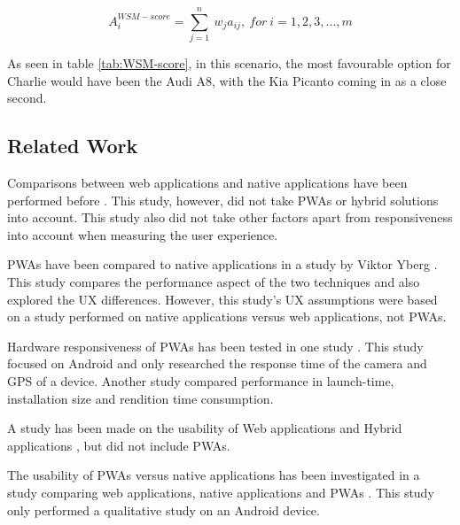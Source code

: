 \begingroup
    \Large
    \begin{equation} \label{eq:WSM-formula}
        A_i^{WSM-score}=\sum_{j=1}^{n} \ w_j a_{ij}, \ for \  i = 1, 2, 3, ... , m
    \end{equation}
\endgroup



As seen in table \ref{tab:WSM-score}, in this scenario, the most favourable option for Charlie would have been the Audi A8, with the Kia Picanto coming in as a close second.

\subsection{Related Work}

Comparisons between web applications and native applications have been performed before \cite{Randleff2019}. This study, however, did not take PWAs or hybrid solutions into account. This study also did not take other factors apart from responsiveness into account when measuring the user experience.

PWAs have been compared to native applications in a study by Viktor Yberg \cite{Yberg2018}. This study compares the performance aspect of the two techniques and also explored the UX differences. However, this study's UX assumptions were based on a study \cite{Jobe2013} performed on native applications versus web applications, not PWAs.

Hardware responsiveness of PWAs has been tested in one study \cite{Fransson2017}. This study focused on Android and only researched the response time of the camera and GPS of a device. Another study \cite{HansenGronli2017} compared performance in launch-time, installation size and rendition time consumption.

A study has been made on the usability of Web applications and Hybrid applications \cite{KoziokasPanagiotisTselikas2017}, but did not include PWAs.

The usability of PWAs versus native applications has been investigated in a study comparing web applications, native applications and PWAs \cite{AndradeMartinez2018}. This study only performed a qualitative study on an Android device.
